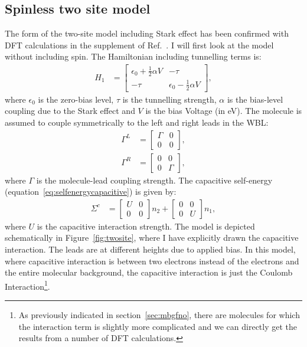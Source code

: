 \subsection{Spinless two site model}
The form of the two-site model including Stark effect has been confirmed with DFT calculations in the supplement of Ref.~\cite{perrinnano}. I  will first look at the model without including spin. The Hamiltonian including tunnelling terms is:
\begin{align}
H_1 &= \begin{bmatrix} \epsilon_0 + \frac{1}{2} \alpha V & -\tau \\
-\tau & \epsilon_0 - \frac{1}{2} \alpha V\end{bmatrix},
\label{eq:spinlesshamiltonian}
\end{align}
where $\epsilon_0$ is the zero-bias level, $\tau$ is the tunnelling strength, $\alpha$ is the bias-level coupling due to the Stark effect and $V$ is the bias Voltage (in eV). The molecule is assumed to couple symmetrically to the left and right leads in the WBL:
\begin{align*}
\Gamma^L &= \begin{bmatrix} \Gamma & 0 \\ 0 & 0 \end{bmatrix},\\ \Gamma^R &= \begin{bmatrix} 0 & 0 \\ 0 & \Gamma \end{bmatrix},
\end{align*}
where $\Gamma$ is the molecule-lead coupling strength. The capacitive self-energy (equation~\ref{eq:selfenergycapacitive}) is given by:
\begin{align*}
\Sigma^c &= \begin{bmatrix} U & 0 \\ 0 & 0 \end{bmatrix} n_2 + \begin{bmatrix} 0 & 0 \\ 0 & U \end{bmatrix} n_1,
\end{align*}
where $U$ is the capacitive interaction strength.  The model is depicted schematically in Figure~\ref{fig:twosite}, where I have explicitly drawn the capacitive interaction. The leads are at different heights due to applied bias. In this model, where capacitive interaction is between two electrons instead of the electrons and the entire molecular background, the capacitive interaction is just the Coulomb Interaction\footnote{As previously indicated in section~\ref{sec:mbgfno}, there are molecules for which the interaction term is slightly more complicated and we can directly get the results from a number of DFT calculations.}.


